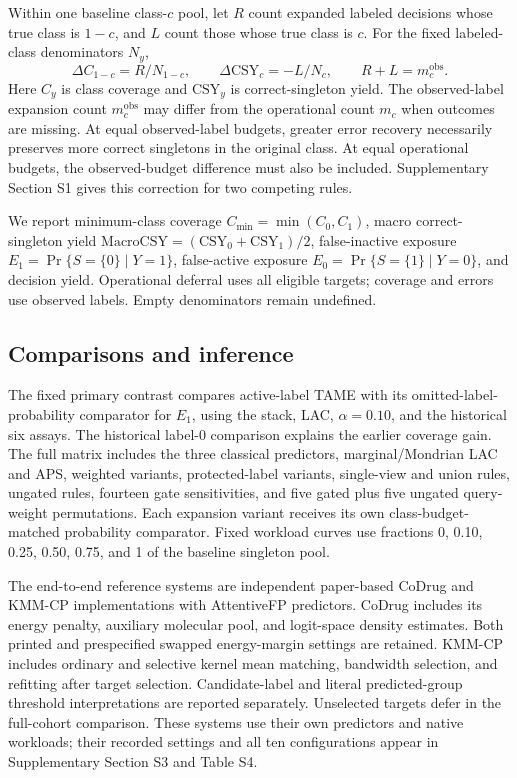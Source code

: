 Within one baseline class-$c$ pool, let $R$ count expanded labeled decisions whose true class is $1-c$, and $L$ count those whose true class is $c$. For the fixed labeled-class denominators $N_y$,
\begin{equation}
 \Delta C_{1-c}=R/N_{1-c},\qquad
 \Delta\mathrm{CSY}_c=-L/N_c,\qquad R+L=m_c^{\mathrm{obs}}.
\end{equation}
Here $C_y$ is class coverage and $\mathrm{CSY}_y$ is correct-singleton yield. The observed-label expansion count $m_c^{\mathrm{obs}}$ may differ from the operational count $m_c$ when outcomes are missing. At equal observed-label budgets, greater error recovery necessarily preserves more correct singletons in the original class. At equal operational budgets, the observed-budget difference must also be included. Supplementary Section S1 gives this correction for two competing rules.

We report minimum-class coverage $C_{\min}=\min(C_0,C_1)$, macro correct-singleton yield $\mathrm{MacroCSY}=(\mathrm{CSY}_0+\mathrm{CSY}_1)/2$, false-inactive exposure $E_1=\Pr\{S=\{0\}\mid Y=1\}$, false-active exposure $E_0=\Pr\{S=\{1\}\mid Y=0\}$, and decision yield. Operational deferral uses all eligible targets; coverage and errors use observed labels. Empty denominators remain undefined.

\subsection{Comparisons and inference}
The fixed primary contrast compares active-label TAME with its omitted-label-probability comparator for $E_1$, using the stack, LAC, $\alpha=0.10$, and the historical six assays. The historical label-0 comparison explains the earlier coverage gain. The full matrix includes the three classical predictors, marginal/Mondrian LAC and APS, weighted variants, protected-label variants, single-view and union rules, ungated rules, fourteen gate sensitivities, and five gated plus five ungated query-weight permutations. Each expansion variant receives its own class-budget-matched probability comparator. Fixed workload curves use fractions 0, 0.10, 0.25, 0.50, 0.75, and 1 of the baseline singleton pool.

The end-to-end reference systems are independent paper-based CoDrug and KMM-CP implementations with AttentiveFP predictors. CoDrug includes its energy penalty, auxiliary molecular pool, and logit-space density estimates. Both printed and prespecified swapped energy-margin settings are retained. KMM-CP includes ordinary and selective kernel mean matching, bandwidth selection, and refitting after target selection. Candidate-label and literal predicted-group threshold interpretations are reported separately. Unselected targets defer in the full-cohort comparison. These systems use their own predictors and native workloads; their recorded settings and all ten configurations appear in Supplementary Section S3 and Table S4.

